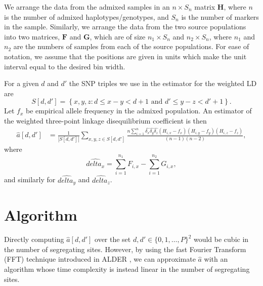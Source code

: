 \documentclass[10pt]{article}
\begin{document}
We arrange the data from the admixed samples in an $n\times S_n $ matrix
$\mathbf{H}$, where $n$ is the number of admixed haplotypes/genotypes, and $S_n$
is the number of markers in the sample. Similarly, we arrange the data from the
two source populations into two matrices, $\mathbf{F}$ and $\mathbf{G}$,
which are of size $n_1\times S_n$ and $n_2\times S_n$, where $n_1$ and $n_2$ are
the numbers of samples from each of the source populations.
For ease of notation, we assume that the positions are given in units which make
the unit interval equal to the desired bin width.

For a given $d$ and $d'$ the SNP triples we use in the estimator for the
weighted LD are $$ S[d,d'] = \left\{x,y,z: d\leq  x-y < d+1 \text{ and } d' \leq
y-z < d'+1 \right\}. $$ Let $f_x$ be empirical allele frequency in the admixed
population. An estimator of the weighted three-point linkage disequilibrium
coefficient is then
\begin{align*}
	\hat{a}[d,d']&=
	\frac{1}{|S[d,d']|}
	\sum_{x,y,z\in S[d,d']}
		\frac{n\sum_{i=1}^n
		\hat{\delta_x}\hat{\delta_y}\hat{\delta_z}
		(H_{i,x}-f_x)(H_{i,y}-f_y)(H_{i,z}-f_z)}{(n-1)(n-2)},
\end{align*}
where
$$
	\hat{delta_x} = \sum_{i=1}^{n_1} F_{i,x} - \sum_{i=1}^{n_2} G_{i,x},
$$
and similarly for $\hat{delta_y}$ and $\hat{delta_z}$.

\section{Algorithm}
Directly computing $\hat{a}[d,d']$ over the set $d,d'\in \{0,1,\dots,P\}^2$
would be cubic in the number of segregating sites. However, by using the fast
Fourier Transform (FFT) technique introduced in ALDER \cite{loh2013inferring},
we can approximate $\hat{a}$ with an algorithm whose time complexity is instead
linear in the number of segregating sites.
\end{document}
